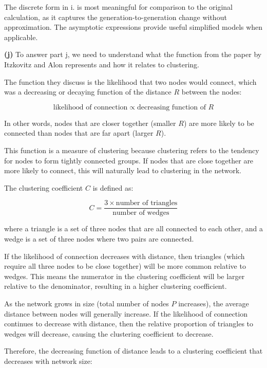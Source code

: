 \documentclass{article}
\begin{document}
The discrete form in i. is most meaningful for comparison to the original calculation, as it captures the generation-to-generation change without approximation. The asymptotic expressions provide useful simplified models when applicable.


\textbf{(j)} To answer part j, we need to understand what the function from the paper by Itzkovitz and Alon represents and how it relates to clustering.

The function they discuss is the likelihood that two nodes would connect, which was a decreasing or decaying function of the distance $R$ between the nodes:

\begin{equation*}
\text{likelihood of connection} \propto \text{decreasing function of }R
\end{equation*}

In other words, nodes that are closer together (smaller $R$) are more likely to be connected than nodes that are far apart (larger $R$).

This function is a measure of clustering because clustering refers to the tendency for nodes to form tightly connected groups. If nodes that are close together are more likely to connect, this will naturally lead to clustering in the network.

The clustering coefficient $C$ is defined as:

\begin{equation*}
C = \frac{3 \times \text{number of triangles}}{\text{number of wedges}}
\end{equation*}

where a triangle is a set of three nodes that are all connected to each other, and a wedge is a set of three nodes where two pairs are connected.

If the likelihood of connection decreases with distance, then triangles (which require all three nodes to be close together) will be more common relative to wedges. This means the numerator in the clustering coefficient will be larger relative to the denominator, resulting in a higher clustering coefficient.

As the network grows in size (total number of nodes $P$ increases), the average distance between nodes will generally increase. If the likelihood of connection continues to decrease with distance, then the relative proportion of triangles to wedges will decrease, causing the clustering coefficient to decrease.

Therefore, the decreasing function of distance leads to a clustering coefficient that decreases with network size:
\end{document}
